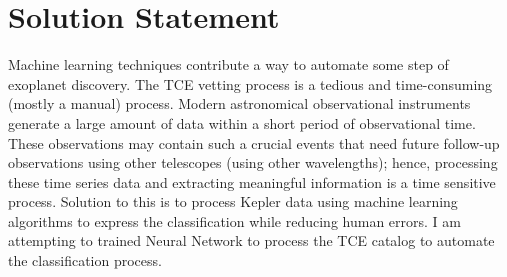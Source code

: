\section{Solution Statement}

Machine learning techniques contribute a way to automate some step of exoplanet discovery. The TCE vetting process is a tedious and time-consuming (mostly a manual) process. Modern astronomical observational instruments generate a large amount of data within a short period of observational time. These observations may contain such a crucial events that need future follow-up observations using other telescopes (using other wavelengths); hence, processing these time series data and extracting meaningful information is a time sensitive process. Solution to this is to process Kepler data using machine learning algorithms to express the classification while reducing human errors. I am attempting to trained Neural Network to process the TCE catalog to automate the classification process. 
